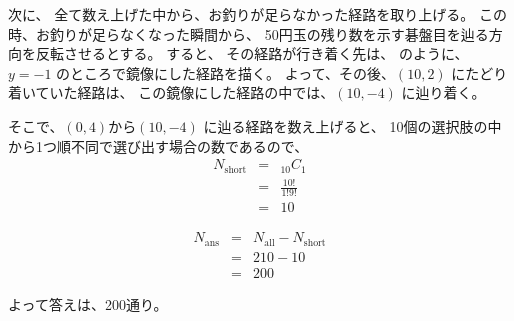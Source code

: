 次に、
全て数え上げた中から、お釣りが足らなかった経路を取り上げる。
この時、お釣りが足らなくなった瞬間から、
50円玉の残り数を示す碁盤目を辿る方向を反転させるとする。
すると、
その経路が行き着く先は、
のように、
$y=-1$ のところで鏡像にした経路を描く。
よって、その後、$(10,2)$ にたどり着いていた経路は、
この鏡像にした経路の中では、$(10,-4)$ に辿り着く。

そこで、$(0,4)$から$(10,-4)$ に辿る経路を数え上げると、
10個の選択肢の中から1つ順不同で選び出す場合の数であるので、
  \begin{eqnarray}
    N_{\text{short}} & = & _{10}C_{1}
  \\
      & = &
        \frac{10!}{1! 9!}
  \\
      & = &
        10
  \end{eqnarray}

  \begin{eqnarray}
    N_{\text{ans}} & = & N_{\text{all}} - N_{\text{short}}
  \\
      & = & 210 - 10
  \\
      & = & 200
  \end{eqnarray}

よって答えは、200通り。


